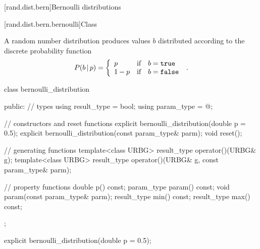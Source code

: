 
[rand.dist.bern]{Bernoulli distributions}%
%
%


[rand.dist.bern.bernoulli]{Class }%
%
%

\pnum
A  random number distribution
produces  values $b$
distributed according to
the discrete probability function
%
%
\[%
 P(b\,|\,p)
      = \left\{ \begin{array}{lcl}
          p    &  \mbox{if} & b = \tcode{true} \\
          1-p  &  \mbox{if} & b = \tcode{false}
        \end{array}\right.
\; \mbox{.}
\]

%
\begin{codeblock}
class bernoulli_distribution {
public:
  // types
  using result_type = bool;
  using param_type  = @\unspec@;

  // constructors and reset functions
  explicit bernoulli_distribution(double p = 0.5);
  explicit bernoulli_distribution(const param_type& parm);
  void reset();

  // generating functions
  template<class URBG>
    result_type operator()(URBG& g);
  template<class URBG>
    result_type operator()(URBG& g, const param_type& parm);

  // property functions
  double p() const;
  param_type param() const;
  void param(const param_type& parm);
  result_type min() const;
  result_type max() const;
};
\end{codeblock}


%
\begin{itemdecl}
explicit bernoulli_distribution(double p = 0.5);
\end{itemdecl}

